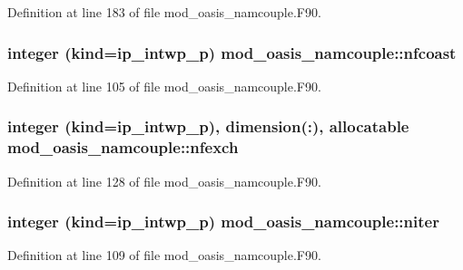 Definition at line 183 of file mod\+\_\+oasis\+\_\+namcouple.\+F90.

\hypertarget{classmod__oasis__namcouple_a57f1b6f111a5257a4d6f5a4b18fa6250}{
\subsubsection[{nfcoast}]{\setlength{\rightskip}{0pt plus 5cm}integer (kind=ip\+\_\+intwp\+\_\+p) mod\+\_\+oasis\+\_\+namcouple\+::nfcoast\hspace{0.3cm}{\ttfamily [private]}}}\label{classmod__oasis__namcouple_a57f1b6f111a5257a4d6f5a4b18fa6250}


Definition at line 105 of file mod\+\_\+oasis\+\_\+namcouple.\+F90.

\hypertarget{classmod__oasis__namcouple_ac6216c78a2779e49f90a9a95a39c27d7}{
\subsubsection[{nfexch}]{\setlength{\rightskip}{0pt plus 5cm}integer (kind=ip\+\_\+intwp\+\_\+p), dimension(\+:), allocatable mod\+\_\+oasis\+\_\+namcouple\+::nfexch\hspace{0.3cm}{\ttfamily [private]}}}\label{classmod__oasis__namcouple_ac6216c78a2779e49f90a9a95a39c27d7}


Definition at line 128 of file mod\+\_\+oasis\+\_\+namcouple.\+F90.

\hypertarget{classmod__oasis__namcouple_a6246780a56635119fd8f7935456b06cf}{
\subsubsection[{niter}]{\setlength{\rightskip}{0pt plus 5cm}integer (kind=ip\+\_\+intwp\+\_\+p) mod\+\_\+oasis\+\_\+namcouple\+::niter\hspace{0.3cm}{\ttfamily [private]}}}\label{classmod__oasis__namcouple_a6246780a56635119fd8f7935456b06cf}


Definition at line 109 of file mod\+\_\+oasis\+\_\+namcouple.\+F90.

